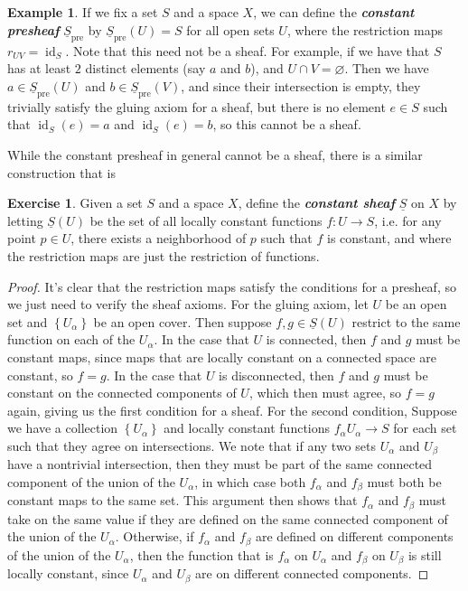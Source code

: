 \documentclass[psamsfonts]{amsart}
\theoremstyle{definition}
\newtheorem{exmp}[thm]{Example}
\newtheorem{exer}[thm]{Exercise}
\theoremstyle{remark}
\renewcommand{\emptyset}{\varnothing}
\newcommand{\ib}[1]{\textbf{\textit{#1}}}
\newcommand{\set}[1]{\left\lbrace #1 \right\rbrace}
\DeclareMathOperator{\id}{id}
\begin{document}
%
\begin{exmp}
If we fix a set $S$ and a space $X$, we can define the \ib{constant presheaf} $\underline{S}_{\text{pre}}$ by $\underline{S}_{\text{pre}}(U) = S$ for all open sets $U$, where the restriction maps $r_{UV} = \id_S$. Note that this need not be a sheaf. For example, if we have that $S$ has at least $2$ distinct elements (say $a$ and $b$), and $U \cap V = \emptyset$. Then we have $a \in \underline{S}_{\text{pre}}(U)$ and $b \in \underline{S}_{\text{pre}}(V)$, and since their intersection is empty, they trivially satisfy the gluing axiom for a sheaf, but there is no element $e \in S$ such that $\id_S(e) = a$ and $\id_S(e) = b$, so this cannot be a sheaf.
\end{exmp}
While the constant presheaf in general cannot be a sheaf, there is a similar construction that is 
\begin{exer}
Given a set $S$ and a space $X$, define the \ib{constant sheaf} $\underline{S}$ on $X$ by letting $\underline{S}(U)$ be the set of all locally constant functions $f: U \to S$, i.e. for any point $p \in U$, there exists a neighborhood of $p$ such that $f$ is constant, and where the restriction maps are just the restriction of functions.
\end{exer}
%
\begin{proof}
It's clear that the restriction maps satisfy the conditions for a presheaf, so we just need to verify the sheaf axioms. For the gluing axiom, let $U$ be an open set and $\set{U_\alpha}$ be an open cover. Then suppose $f,g \in \underline{S}(U)$ restrict to the same function on each of the $U_\alpha$. In the case that $U$ is connected, then $f$ and $g$ must be constant maps, since maps that are locally constant on a connected space are constant, so $f = g$. In the case that $U$ is disconnected, then $f$ and $g$ must be constant on the connected components of $U$, which then must agree, so $f = g$ again, giving us the first condition for a sheaf. For the second condition, Suppose we have a collection $\set{U_\alpha}$ and locally constant functions $f_\alpha U_\alpha \to S$ for each set such that they agree on intersections. We note that if any two sets $U_\alpha$ and $U_\beta$ have a nontrivial intersection, then they must be part of the same connected component of the union of the $U_\alpha$, in which case both $f_\alpha$ and $f_\beta$ must both be constant maps to the same set. This argument then shows that $f_\alpha$ and $f_\beta$ must take on the same value if they are defined on the same connected component of the union of the $U_\alpha$. Otherwise, if $f_\alpha$ and $f_\beta$ are defined on different components of the union of the $U_\alpha$, then the function that is $f_\alpha$ on $U_\alpha$ and $f_\beta$ on $U_\beta$ is still locally constant, since $U_\alpha$ and $U_\beta$ are on different connected components.
\end{proof}
\end{document}
